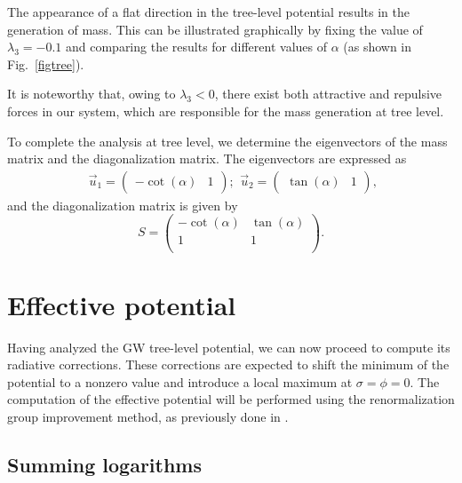 \documentclass[11pt,a4paper,english,superscriptaddress,preprint,aps,prd]{revtex4}
\begin{document}
The appearance of a flat direction in the tree-level potential results in the generation of mass. This can be illustrated graphically by fixing the value of $\lambda_3=-0.1$ and comparing the results for different values of $\alpha$ (as shown in Fig.~\ref{figtree}).

It is noteworthy that, owing to $\lambda_3<0$, there exist both attractive and repulsive forces in our system, which are responsible for the mass generation at tree level.

To complete the analysis at tree level, we determine the eigenvectors of the mass matrix and the diagonalization matrix. The eigenvectors are expressed as
\begin{subequations}
 \begin{eqnarray}
  \vec{u}_1=\begin{pmatrix}
   -\cot(\alpha) & 1
  \end{pmatrix};
  \end{eqnarray}
  \begin{equation}
   \vec{u}_2 = \begin{pmatrix}
                  \tan(\alpha) & 1
                 \end{pmatrix},
  \end{equation}
\end{subequations}
and the diagonalization matrix is given by
\begin{equation}
 S = \left(
\begin{array}{cc}
 -\cot (\alpha ) & \tan (\alpha ) \\
 1 & 1 \\
\end{array}
\right).
\end{equation}

\section{Effective potential}\label{ll}

Having analyzed the GW tree-level potential, we can now proceed to compute its radiative corrections. These corrections are expected to shift the minimum of the potential to a nonzero value and introduce a local maximum at $\sigma=\phi=0$. The computation of the effective potential will be performed using the renormalization group improvement method, as previously done in \cite{Souza:2020hjd}.

\subsection{Summing logarithms}
\end{document}
